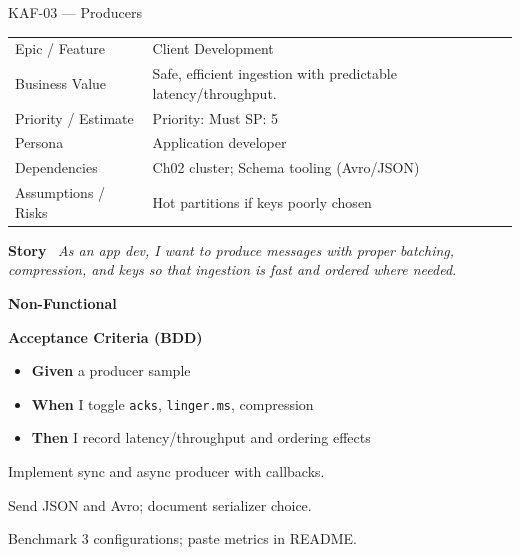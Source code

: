 \documentclass[11pt,a4paper]{article}
\newcommand{\Field}[2]{\textbf{#1}~#2}
\begin{document}
\begin{StoryCardBox}{KAF-03 --- Producers}
\begin{tabularx}{\linewidth}{LY}
 Epic / Feature & Client Development \\
 Business Value & Safe, efficient ingestion with predictable latency/throughput. \\
 Priority / Estimate & Priority: Must \quad SP: 5 \\
 Persona & Application developer \\
 Dependencies & Ch02 cluster; Schema tooling (Avro/JSON) \\
 Assumptions / Risks & Hot partitions if keys poorly chosen \\
\end{tabularx}

\medskip
\Field{Story}{\; \emph{As an app dev, I want to produce messages with proper batching, compression, and keys so that ingestion is fast and ordered where needed.}}

\medskip
\Field{Non-Functional}{\; \; }

\medskip
\Field{Acceptance Criteria (BDD)}{}
\begin{itemize}[leftmargin=1.2em, itemsep=1pt]
  \item \textbf{Given} a producer sample
  \item \textbf{When} I toggle \texttt{acks}, \texttt{linger.ms}, compression
  \item \textbf{Then} I record latency/throughput and ordering effects
\end{itemize}

\begin{TasksBox}
\begin{tasklist}
  \item Implement sync and async producer with callbacks.
  \item Send JSON and Avro; document serializer choice.
  \item Benchmark 3 configurations; paste metrics in README.
\end{tasklist}
\end{TasksBox}
\end{StoryCardBox}
\clearpage
\end{document}
